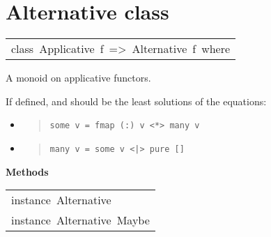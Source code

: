 \section{Alternative class
}

\begin{haddockdesc}
\item[\begin{tabular}{@{}l}
class\ Applicative\ f\ =>\ Alternative\ f\ where
\end{tabular}]\haddockbegindoc
A monoid on applicative functors.\par
If defined,  and  should be the least solutions
 of the equations:\par
\begin{itemize}
\item
\begin{quote}
{\haddockverb\begin{verbatim}
some v = fmap (:) v <*> many v\end{verbatim}}
\end{quote}

\item
\begin{quote}
{\haddockverb\begin{verbatim}
many v = some v <|> pure []\end{verbatim}}
\end{quote}

\end{itemize}

\haddockpremethods{}\textbf{Methods}
\end{haddockdesc}
\begin{haddockdesc}
\item[\begin{tabular}{@{}l}
instance\ Alternative\ {\char 91}{\char 93}\\instance\ Alternative\ Maybe
\end{tabular}]
\end{haddockdesc}

